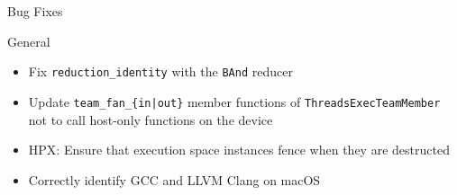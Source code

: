 
\begin{frame}[fragile]

  {\Huge Bug Fixes}

  \vspace{10pt}

\end{frame}





%



\begin{frame}[fragile]{General}
  \begin{itemize}
    \item Fix \texttt{reduction\_identity} with the \texttt{BAnd} reducer
    \item Update \texttt{team\_fan\_\{in|out\}} member functions of \texttt{ThreadsExecTeamMember} not to call host-only functions on the device
    \item HPX: Ensure that execution space instances fence when they are destructed
    \item Correctly identify GCC and LLVM Clang on macOS
  \end{itemize}
\end{frame}

